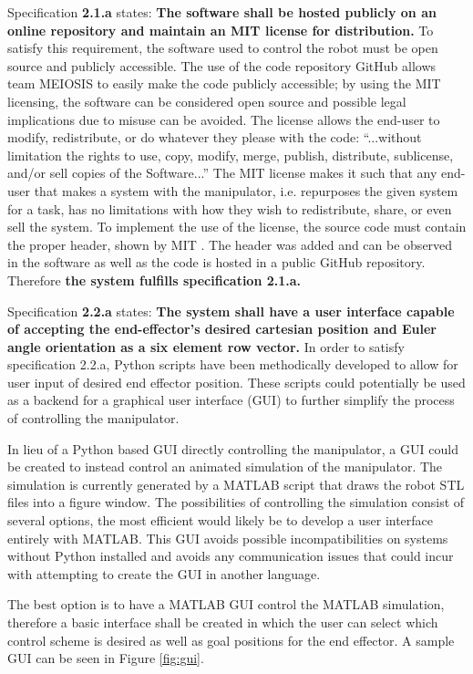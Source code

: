 Specification \textbf{2.1.a} states: \textbf{The software shall be hosted publicly on an online repository and maintain an MIT license for distribution.} To satisfy this requirement, the software used to control the robot must be open source and publicly accessible. The use of the code repository GitHub allows team MEIOSIS to easily make the code publicly accessible; by using the MIT licensing, the software can be considered open source and possible legal implications due to misuse can be avoided. The license allows the end-user to modify, redistribute, or do whatever they please with the code: “...without limitation the rights to use, copy, modify, merge, publish, distribute, sublicense, and/or sell copies of the Software...”\cite{mit} The MIT license makes it such that any end-user that makes a system with the manipulator, i.e. repurposes the given system for a task, has no limitations with how they wish to redistribute, share, or even sell the system. To implement the use of the license, the source code must contain the proper header, shown by MIT \cite{mit}. The header was added and can be observed in the software as well as the code is hosted in a public GitHub repository. Therefore \textbf{the system fulfills specification 2.1.a.}


Specification \textbf{2.2.a} states: \textbf{The system shall have a user interface capable of accepting the end-effector’s desired cartesian position and Euler angle orientation as a six element row vector.} In order to satisfy specification 2.2.a, Python scripts have been methodically developed to allow for user input of desired end effector position. These scripts could potentially be used as a backend for a graphical user interface (GUI) to further simplify the process of controlling the manipulator.

In lieu of a Python based GUI directly controlling the manipulator, a GUI could be created to instead control an animated simulation of the manipulator. The simulation is currently generated by a MATLAB script that draws the robot STL files into a figure window. The possibilities of controlling the simulation consist of several options, the most efficient would likely be to develop a user interface entirely with MATLAB. This GUI avoids possible incompatibilities on systems without Python installed and avoids any communication issues that could incur with attempting to create the GUI in another language.

\newpage
The best option is to have a MATLAB GUI control the MATLAB simulation, therefore a basic interface shall be created in which the user can select which control scheme is desired as well as goal positions for the end effector. A sample GUI can be seen in Figure \ref{fig:gui}.

